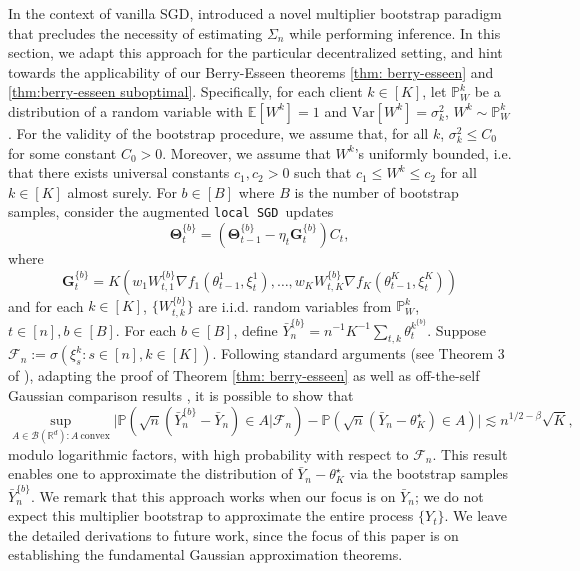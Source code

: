 \documentclass[a4paper,11pt]{article}
\numberwithin{equation}{section}
\theoremstyle{plain}
\theoremstyle{remark}
\def\IE{\mathbb{E}}
\def\R{\mathbb{R}}
\def\bG{\mathbf{G}}
\def\bT{\mathbf{\Theta}}
\newcommand{\DFL}{\texttt{local SGD}}
\newcommand{\minparam}{\theta^\star_K}
\newcommand{\IP}{\mathbb{P}}
\newcommand{\var}{\mathrm{Var}}
\begin{document}
 In the context of vanilla SGD, \cite{fang2018jmlr, fang2019sjs, sheshukova2025gaussian} introduced a novel multiplier bootstrap paradigm that precludes the necessity of estimating $\Sigma_n$ while performing inference. In this section, we adapt this approach for the particular decentralized setting, and hint towards the applicability of our Berry-Esseen theorems \ref{thm: berry-esseen} and \ref{thm:berry-esseen suboptimal}. Specifically, for each client $k\in [K]$, let $\IP_W^k$ be a distribution of a random variable with $\IE[W^k]=1$ and $\var[W^k]=\sigma_k^2$, $W^k \sim \IP_W^k$. For the validity of the bootstrap procedure, we assume that, for all $k$, $\sigma^2_k \leq C_0$ for some constant $C_0>0$. Moreover, we assume that $W^k$'s uniformly bounded, i.e. that there exists universal constants $c_1, c_2>0$ such that $c_1 \leq W^k \leq c_2$ for all $k \in [K]$ almost surely. For $b \in [B]$ where $B$ is the number of bootstrap samples, consider the augmented \DFL\ updates
 \[ \bT^{\{b\}}_t = (\bT^{\{b\}}_{t-1} - \eta_t\bG_t^{\{b\}})C_t,\] where \[\bG_t^{\{b\}} = K(w_1 W_{t,1}^{\{b\}}\nabla f_1(\theta_{t-1}^1, \xi_t^1), \ldots, w_K W_{t,K}^{\{b\}}\nabla f_K(\theta_{t-1}^K, \xi_t^K))\] and for each $k \in [K]$, $\{W_{t,k}^{\{b\}}\}$ are i.i.d. random variables from $\IP_W^k$, $t\in [n], b\in [B]$. For each $b\in [B]$, define $\bar{Y}_n^{\{b\}}= n^{-1}K^{-1}\sum_{t,k}\theta_t^{k^{\{b\}}}$. Suppose $\mathcal{F}_n:=\sigma(\xi_s^k: s\in [n], k\in [K])$. Following standard arguments (see Theorem 3 of \cite{sheshukova2025gaussian}), adapting the proof of Theorem \ref{thm: berry-esseen} as well as off-the-self Gaussian comparison results \cite{chernozhukov2017detailed, devroye2018total}, it is possible to show that
\[ \sup_{A \in \mathcal{B}(\R^d): A \ \text{convex}}\bigg|\IP(\sqrt{n}(\bar{Y}_n^{\{b\}} - \bar{Y}_n) \in A | \mathcal{F}_n) - \IP(\sqrt{n}(\bar{Y}_n - \minparam) \in A)\bigg| \lesssim n^{1/2-\beta}\sqrt{K}, \]
modulo logarithmic factors, with high probability with respect to $\mathcal{F}_n$. This result enables one to approximate the distribution of $\bar{Y}_n - \minparam$ via the bootstrap samples $\bar{Y}_n^{\{b\}}$. We remark that this approach works when our focus is on $\bar{Y}_n$; we do not expect this multiplier bootstrap to approximate the entire process $\{Y_t\}$. We leave the detailed derivations to future work, since the focus of this paper is on establishing the fundamental Gaussian approximation theorems.
\end{document}

